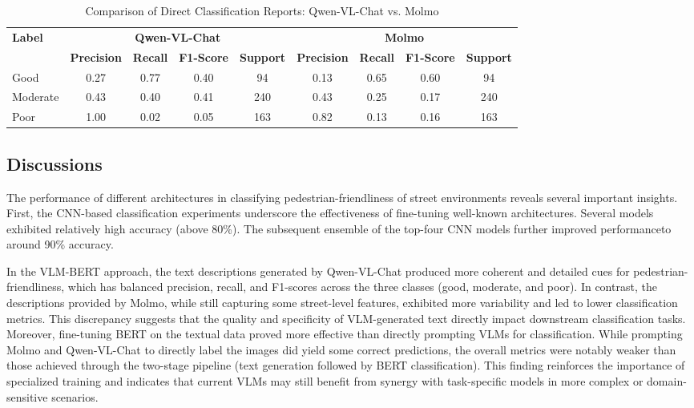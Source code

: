 \documentclass[11pt]{article}
\begin{document}
\begin{table}[H]
\centering
\caption{Comparison of Direct Classification Reports: Qwen-VL-Chat vs. Molmo}
\label{tab:direct_compare}
\begin{tabular}{l|cccc|cccc}
\hline
\multirow{2}{*}{\textbf{Label}} & \multicolumn{4}{c|}{\textbf{Qwen-VL-Chat}} & \multicolumn{4}{c}{\textbf{Molmo}} \\
 & \textbf{Precision} & \textbf{Recall} & \textbf{F1-Score} & \textbf{Support} & \textbf{Precision} & \textbf{Recall} & \textbf{F1-Score} & \textbf{Support} \\
\hline
Good      & 0.27 & 0.77 & 0.40 & 94  & 0.13 & 0.65 & 0.60 & 94  \\
Moderate  & 0.43 & 0.40 & 0.41 & 240 & 0.43 & 0.25 & 0.17 & 240 \\
Poor      & 1.00 & 0.02 & 0.05 & 163 & 0.82 & 0.13 & 0.16 & 163 \\
\hline
\end{tabular}
\end{table}

\subsection{Discussions}
The performance of different architectures in classifying pedestrian-friendliness of street environments reveals several important insights. First, the CNN-based classification experiments underscore the effectiveness of fine-tuning well-known architectures. Several models exhibited relatively high accuracy (above 80\%). The subsequent ensemble of the top-four CNN models further improved performanceto around 90\% accuracy. 

In the VLM-BERT approach, the text descriptions generated by Qwen-VL-Chat produced more coherent and detailed cues for pedestrian-friendliness, which has balanced precision, recall, and F1-scores across the three classes (good, moderate, and poor). In contrast, the descriptions provided by Molmo, while still capturing some street-level features, exhibited more variability and led to lower classification metrics. This discrepancy suggests that the quality and specificity of VLM-generated text directly impact downstream classification tasks. Moreover, fine-tuning BERT on the textual data proved more effective than directly prompting VLMs for classification. While prompting Molmo and Qwen-VL-Chat to directly label the images did yield some correct predictions, the overall metrics were notably weaker than those achieved through the two-stage pipeline (text generation followed by BERT classification). This finding reinforces the importance of specialized training and indicates that current VLMs may still benefit from synergy with task-specific models in more complex or domain-sensitive scenarios.
\end{document}
